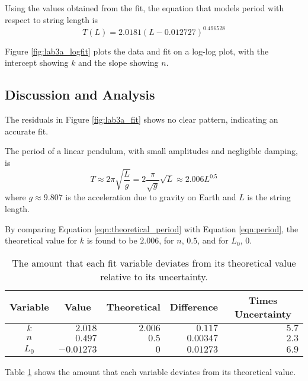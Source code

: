 \documentclass[aps,twocolumn,secnumarabic,nobalancelastpage,amsmath,amssymb,nofootinbib,floatfix,letterpaper]{revtex4}
\begin{document}
Using the values obtained from the fit, the equation that models period with respect to string length is
\begin{equation}
    T(L) = 2.0181(L - 0.012727)^{0.496528}
    \label{eqn:actual_period}
\end{equation}

Figure \ref{fig:lab3a_logfit} plots the data and fit on a log-log plot, with the intercept showing \(k\) and the slope
showing \(n\).

\subsection{Discussion and Analysis}
\label{sec:lab3a_analysis}

The residuals in Figure \ref{fig:lab3a_fit} shows no clear pattern, indicating an accurate fit.

The period of a linear pendulum, with small amplitudes and negligible damping, is \cite{period}
\begin{equation}
    T \approx 2\pi\sqrt{\frac{L}{g}} = 2\frac{\pi}{\sqrt{g}}\sqrt{L} \approx 2.006L^{0.5}
    \label{eqn:theoretical_period}
\end{equation}
where \(g \approx 9.807\) is the acceleration due to gravity on Earth and \(L\) is the string length.

By comparing Equation \ref{eqn:theoretical_period} with Equation \ref{eqn:period}, the theoretical value for \(k\) is found to be
\(2.006\), for \(n\), \(0.5\), and for \(L_0\), \(0\).

\begin{table}[ht]
    \begin{tabular}{c|r|r|r|r}
        Variable & \multicolumn{1}{c|}{Value} & \multicolumn{1}{c|}{Theoretical} & \multicolumn{1}{c|}{Difference} & \multicolumn{1}{c}{Times Uncertainty} \\
        \hline
        \(k\) & \(2.018\) & \(2.006\) & \(0.117\) & \(5.7\) \\
        \(n\) & \(0.497\) & \(0.5\) & \(0.00347\) & \(2.3\) \\
        \(L_0\) & \(-0.01273\) & \(0\) & \(0.01273\) & \(6.9\) \\
    \end{tabular}
    \caption{The amount that each fit variable deviates from its theoretical value relative to its uncertainty.}
    \label{table:lab3a_deviations}
\end{table}

Table \ref{table:lab3a_deviations} shows the amount that each variable deviates from its theoretical value.
\end{document}

